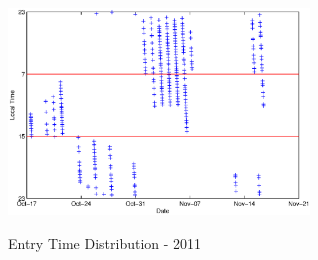 \documentclass[a4paper,11pt]{article}
\begin{document}
\begin{figure}[htbp]
\begin{minipage}{1.0\hsize}
\end{minipage}
\begin{minipage}{1.0\hsize}
\begin{center}
\includegraphics[width =8cm]{PlotTime2011_4.eps}
\\
\caption{Entry Time Distribution - 2011}
\end{center}
\end{minipage}
\end{figure}


 
\end{document}
